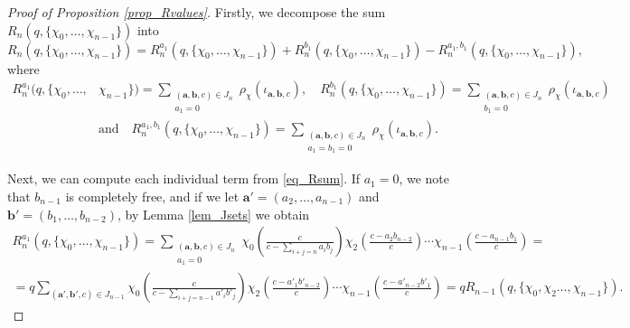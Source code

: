 \documentclass{article}
\theoremstyle{plain}
\theoremstyle{definition}
\begin{document}
    \begin{proof}[Proof of Proposition \ref{prop_Rvalues}]
        Firstly, we decompose the sum $R_n(q,\{\chi_0,\ldots,\chi_{n-1}\})$ into
        \begin{equation}\label{eq_Rsum}
            R_n(q,\{\chi_0,\ldots,\chi_{n-1}\})=R_n^{a_1}(q,\{\chi_0,\ldots,\chi_{n-1}\})+R_n^{b_1}(q,\{\chi_0,\ldots,\chi_{n-1}\})-R_n^{a_1,b_1}(q,\{\chi_0,\ldots,\chi_{n-1}\}),
        \end{equation}
        where
        \begin{align*}
            R_n^{a_1}(q,\{\chi_0,\ldots,&\chi_{n-1}\})=\sum_{\substack{(\mathbf{a},\mathbf{b},c)\in J_n\\ a_1=0}}\rho_\chi(\iota_{\mathbf{a},\mathbf{b},c}), \quad R_n^{b_1}(q,\{\chi_0,\ldots,\chi_{n-1}\})=\sum_{\substack{(\mathbf{a},\mathbf{b},c)\in J_n\\ b_1=0}}\rho_\chi(\iota_{\mathbf{a},\mathbf{b},c})\\
            &\text{and}\quad R_n^{a_1,b_1}(q,\{\chi_0,\ldots,\chi_{n-1}\})=\sum_{\substack{(\mathbf{a},\mathbf{b},c)\in J_n\\ a_1=b_1=0}}\rho_\chi(\iota_{\mathbf{a},\mathbf{b},c}).
        \end{align*}

        Next, we can compute each individual term from \eqref{eq_Rsum}. If $a_1=0$, we note that $b_{n-1}$ is completely free, and if we let $\mathbf{a}'=(a_2,\ldots,a_{n-1})$ and $\mathbf{b}'=(b_1,\ldots,b_{n-2})$, by Lemma \ref{lem_Jsets} we obtain
        \begin{align*}
            R_n^{a_1}(q,\{\chi_0,\ldots,\chi_{n-1}\})=\sum_{\substack{(\mathbf{a},\mathbf{b},c)\in J_n\\ a_1=0}}\chi_0\left(\frac{c}{c-\sum_{i+j=n}a_ib_j}\right)\chi_2\left(\frac{c-a_2b_{n-2}}{c}\right)%
            \cdots\chi_{n-1}\left(\frac{c-a_{n-1}b_1}{c}\right)=\\
            =q\sum_{(\mathbf{a}',\mathbf{b}',c)\in J_{n-1}}\chi_0\left(\frac{c}{c-\sum_{i+j=n-1}a'_ib'_j}\right)\chi_2\left(\frac{c-a'_1b'_{n-2}}{c}\right)%
            \cdots\chi_{n-1}\left(\frac{c-a'_{n-2}b'_1}{c}\right)=qR_{n-1}(q,\{\chi_0,\chi_2\ldots,\chi_{n-1}\}).
        \end{align*}


\end{proof}
\end{document}
